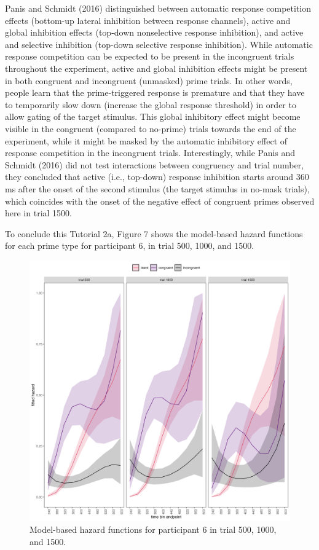 \documentclass[
  man,floatsintext]{apa6}
\begin{document}
Panis and Schmidt (2016) distinguished between automatic response competition effects (bottom-up lateral inhibition between response channels), active and global inhibition effects (top-down nonselective response inhibition), and active and selective inhibition (top-down selective response inhibition). While automatic response competition can be expected to be present in the incongruent trials throughout the experiment, active and global inhibition effects might be present in both congruent and incongruent (unmasked) prime trials. In other words, people learn that the prime-triggered response is premature and that they have to temporarily slow down (increase the global response threshold) in order to allow gating of the target stimulus. This global inhibitory effect might become visible in the congruent (compared to no-prime) trials towards the end of the experiment, while it might be masked by the automatic inhibitory effect of response competition in the incongruent trials.
Interestingly, while Panis and Schmidt (2016) did not test interactions between congruency and trial number, they concluded that active (i.e., top-down) response inhibition starts around 360 ms after the onset of the second stimulus (the target stimulus in no-mask trials), which coincides with the onset of the negative effect of congruent primes observed here in trial 1500.

To conclude this Tutorial 2a, Figure 7 shows the model-based hazard functions for each prime type for participant 6, in trial 500, 1000, and 1500.



\begin{figure}[H]

{\centering \includegraphics[width=0.8\linewidth,height=0.67\textheight,]{../Tutorial_2_Bayesian/figures/M4effects_subject6} 

}

\caption{Model-based hazard functions for participant 6 in trial 500, 1000, and 1500.}\label{fig:plot-hazard-subject6}
\end{figure}
\end{document}

